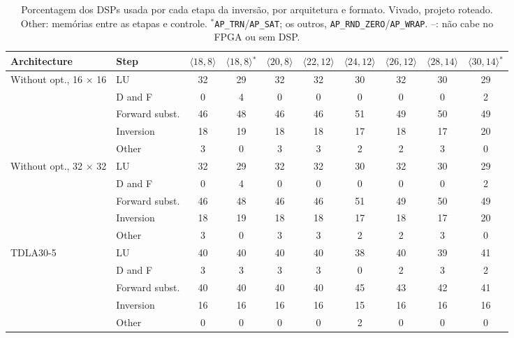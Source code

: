 \begin{table}[htbp]
\caption[Porcentagem dos DSPs usada por cada etapa da inversão, por arquitetura e formato.]{Porcentagem dos DSPs usada por cada etapa da inversão, por arquitetura e formato. Vivado, projeto roteado. Other: memórias entre as etapas e controle. $^{*}$\texttt{AP\_TRN}/\texttt{AP\_SAT}; os outros, \texttt{AP\_RND\_ZERO}/\texttt{AP\_WRAP}. --: não cabe no FPGA ou sem DSP.}
\label{tab:etapas-dsp}
\vspace{4pt} %
\centering
\scriptsize
\renewcommand{\arraystretch}{1.05}
\setlength{\tabcolsep}{3pt}
\begin{tabular}{llcccccccc}
\toprule
\textbf{Architecture} & \textbf{Step} & \textbf{$\langle 18,8\rangle$} & \textbf{$\langle 18,8\rangle$$^{*}$} & \textbf{$\langle 20,8\rangle$} & \textbf{$\langle 22,12\rangle$} & \textbf{$\langle 24,12\rangle$} & \textbf{$\langle 26,12\rangle$} & \textbf{$\langle 28,14\rangle$} & \textbf{$\langle 30,14\rangle$$^{*}$} \\
\midrule
\multirow{5}{*}{Without opt., 16 $\times$ 16} & LU & 32 & 29 & 32 & 32 & 30 & 32 & 30 & 29 \\
 & D and F & 0 & 4 & 0 & 0 & 0 & 0 & 0 & 2 \\
 & Forward subst. & 46 & 48 & 46 & 46 & 51 & 49 & 50 & 49 \\
 & Inversion & 18 & 19 & 18 & 18 & 17 & 18 & 17 & 20 \\
 & Other & 3 & 0 & 3 & 3 & 2 & 2 & 3 & 0 \\
\midrule
\multirow{5}{*}{Without opt., 32 $\times$ 32} & LU & 32 & 29 & 32 & 32 & 30 & 32 & 30 & 29 \\
 & D and F & 0 & 4 & 0 & 0 & 0 & 0 & 0 & 2 \\
 & Forward subst. & 46 & 48 & 46 & 46 & 51 & 49 & 50 & 49 \\
 & Inversion & 18 & 19 & 18 & 18 & 17 & 18 & 17 & 20 \\
 & Other & 3 & 0 & 3 & 3 & 2 & 2 & 3 & 0 \\
\midrule
\multirow{5}{*}{TDLA30-5} & LU & 40 & 40 & 40 & 40 & 38 & 40 & 39 & 41 \\
 & D and F & 3 & 3 & 3 & 3 & 0 & 2 & 3 & 2 \\
 & Forward subst. & 40 & 40 & 40 & 40 & 45 & 43 & 42 & 41 \\
 & Inversion & 16 & 16 & 16 & 16 & 15 & 16 & 16 & 16 \\
 & Other & 0 & 0 & 0 & 0 & 2 & 0 & 0 & 0 \\
\midrule

\end{tabular}
\end{table}
